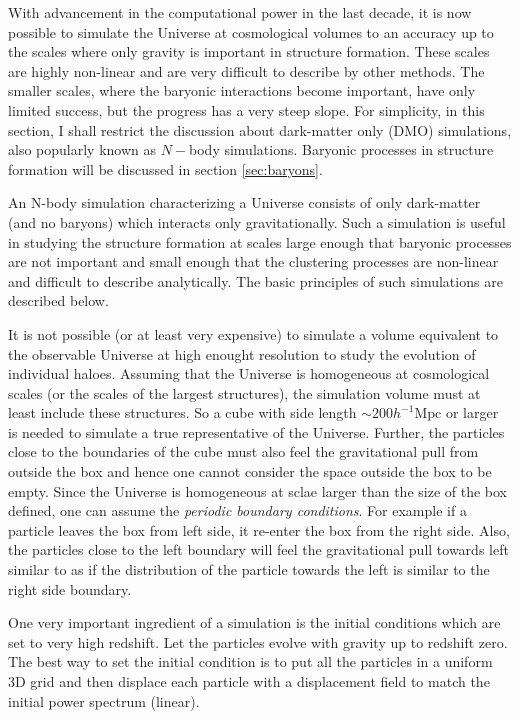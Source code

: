 With advancement in the computational power in the last decade, it is now possible to
simulate the Universe at cosmological volumes to an accuracy up to the scales where
only gravity is important in structure formation. These scales are highly non-linear and are
very difficult to describe by other methods. The smaller scales, where the baryonic
interactions become important, have only limited success, but the progress has a very
steep slope. For simplicity, in this section, I shall restrict the discussion about dark-matter only (DMO)
simulations, also popularly known as $N-$body simulations. Baryonic processes in structure formation will be 
discussed in section \ref{sec:baryons}.

An N-body simulation
characterizing a Universe consists of only dark-matter (and no baryons) which
interacts only gravitationally. Such a simulation is useful in studying the
structure formation at scales large enough that baryonic processes are not 
important and small enough that the clustering processes are non-linear and difficult
to describe analytically. The basic principles of such simulations are described below.

It is not possible (or at least very expensive) to simulate a volume equivalent to the
observable Universe at high enought resolution to study the evolution of individual
haloes. Assuming that the Universe is homogeneous
at cosmological scales (or the scales of the largest structures), the simulation
volume must at least include these structures. So a cube with side length $\sim 200h^{-1} \mathrm{Mpc}$
or larger is needed to simulate a true representative of the Universe. Further, the
particles close to the boundaries of the cube must also feel the gravitational pull
from outside the box and hence one cannot consider the space outside the box to be 
empty. Since the Universe is homogeneous at sclae larger than the size of the box defined, one
can assume the {\it periodic boundary conditions}. For example if a particle leaves the box from left
side, it re-enter the box from the right side. Also, the particles close to the left boundary
will feel the gravitational pull towards left similar to as if the distribution of the particle
towards the left is similar to the right side boundary.

One very important ingredient of a simulation is the initial conditions which are
set to very high redshift. Let the particles evolve with gravity up to redshift zero. 
The best way to set the initial condition is to put all the particles in a uniform 3D grid
and then displace each particle with a displacement field to match the initial power 
spectrum (linear). 

